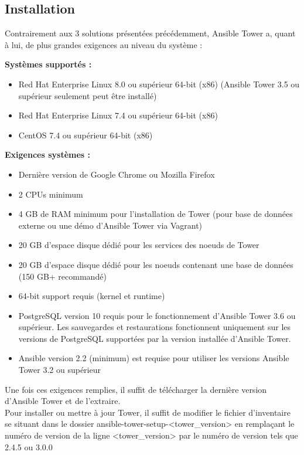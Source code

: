 \documentclass[12pt]{article}
\begin{document}
\subsection{Installation}
Contrairement aux 3 solutions présentées précédemment, Ansible Tower a, quant à lui, de plus grandes exigences au niveau du système :

\textbf{Systèmes supportés :}
\begin{itemize}
    \item Red Hat Enterprise Linux 8.0 ou supérieur 64-bit (x86) (Ansible Tower 3.5 ou supérieur seulement peut être installé)
    \item Red Hat Enterprise Linux 7.4 ou supérieur 64-bit (x86)
    \item CentOS 7.4 ou supérieur 64-bit (x86)
\end{itemize}

\textbf{Exigences systèmes :}
\begin{itemize}
    \item Dernière version de Google Chrome ou Mozilla Firefox
    \item 2 CPUs minimum
    \item 4 GB de RAM minimum pour l'installation de Tower (pour base de données externe ou une démo d'Ansible Tower via Vagrant)
    \item 20 GB d'espace disque dédié pour les services des noeuds de Tower
    \item 20 GB d'espace disque dédié pour les noeuds contenant une base de données (150 GB+ recommandé)
    \item 64-bit support requis (kernel et runtime)
    \item PostgreSQL version 10 requis pour le fonctionnement d'Ansible Tower 3.6 ou supérieur. Les sauvegardes et restaurations fonctionnent uniquement sur les versions de PostgreSQL supportées par la version installée d'Ansible Tower.
    \item Ansible version 2.2 (minimum) est requise pour utiliser les versions Ansible Tower 3.2 ou supérieur
\end{itemize}

Une fois ces exigences remplies, il suffit de télécharger la dernière version d'Ansible Tower et de l'extraire.
\vspace{0.5cm}
\\
Pour installer ou mettre à jour Tower, il suffit de modifier le fichier d'inventaire se situant dans le dossier ansible-tower-setup-<tower\_version> en remplaçant le numéro de version de la ligne <tower\_version> par le numéro de version tels que 2.4.5 ou 3.0.0
\end{document}

